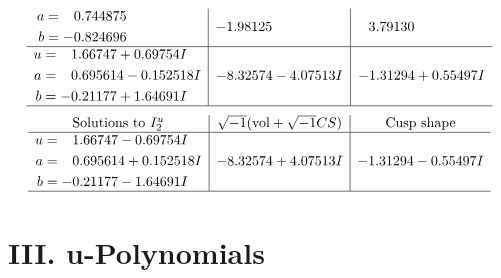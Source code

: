 \documentclass[1p]{elsarticle_modified}
\theoremstyle{definition}
\newcommand{\I}{\sqrt{-1}}
\begin{document}
$$\begin{array}{c|c|c}
\begin{aligned}
a &= \phantom{-}0.744875\phantom{ +0.000000I} \\
b &= -0.824696\phantom{ +0.000000I}\end{aligned}
 & -1.98125\phantom{ +0.000000I} & \phantom{-}3.79130\phantom{ +0.000000I} \\ \hline\begin{aligned}
u &= \phantom{-}1.66747 + 0.69754 I \\
a &= \phantom{-}0.695614 - 0.152518 I \\
b &= -0.21177 + 1.64691 I\end{aligned}
 & -8.32574 - 4.07513 I & -1.31294 + 0.55497 I\\
 \hline 
 \end{array}$$\newpage$$\begin{array}{c|c|c}  
\text{Solutions to }I^u_{2}& \I (\text{vol} + \sqrt{-1}CS) & \text{Cusp shape}\\
 \hline 
\begin{aligned}
u &= \phantom{-}1.66747 - 0.69754 I \\
a &= \phantom{-}0.695614 + 0.152518 I \\
b &= -0.21177 - 1.64691 I\end{aligned}
 & -8.32574 + 4.07513 I & -1.31294 - 0.55497 I\\
 \hline 
 \end{array}$$\newpage
\newpage\renewcommand{\arraystretch}{1}
\centering \section*{ III. u-Polynomials}
\end{document}
